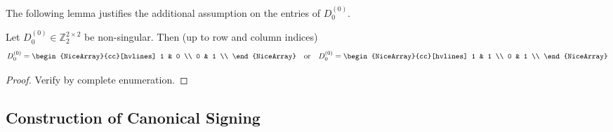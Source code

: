 The following lemma justifies the additional assumption on the entries of $D_{0}^{(0)}$.

\begin{lemma}\label{lem:matrix_z2_2_2_rank_2}
    Let $D_{0}^{(0)} \in \mathbb{Z}_{2}^{2 \times 2}$ be non-singular. Then (up to row and column indices)
    \[
        D_{0}^{(0)} = \begin{NiceArray}{cc}[hvlines] 1 & 0 \\ 0 & 1 \\ \end{NiceArray}
        \quad \text{or} \quad
        D_{0}^{(0)} = \begin{NiceArray}{cc}[hvlines] 1 & 1 \\ 0 & 1 \\ \end{NiceArray}
    \]
\end{lemma}

\begin{proof}
    Verify by complete enumeration.
\end{proof}

\subsection{Construction of Canonical Signing}

